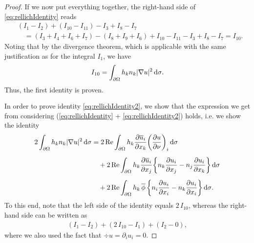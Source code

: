 \begin{proof}
  If we now put everything together, the right-hand side of \eqref{eq:rellichIdentity} reads
  \begin{align*}
    &(I_1 - I_2) + (I_{10} - I_{11}) - I_3 + I_8 - I_7 \\
    &\quad= (I_3 + I_4 + I_6 + I_7) - (I_8 + I_9 + I_6) + I_{10} - I_{11} - I_3 + I_8 - I_7 = I_{10}.
  \end{align*}
  Noting that by the divergence theorem, which is applicable with the same justification as for the integral $I_1$, we have
  \begin{align*}
    I_{10} = \int_{\partial\Omega} h_k n_k |\nabla u|^2 \, {\operatorname{d}\!{\sigma}}.
  \end{align*}
  Thus, the first identity is proven.

  In order to prove identity \eqref{eq:rellichIdentity2}, we show that the expression we get from considering (\eqref{eq:rellichIdentity} + \eqref{eq:rellichIdentity2}) holds, i.e. we show the identity
  \begin{align*}
    2 \int_{\partial\Omega} h_k n_k |\nabla u|^2 \, {\operatorname{d}\!{\sigma}}
    &= 2 \operatorname{Re} \int_{\partial\Omega} h_k \frac{\partial \overline u_i}{\partial x_k} \bigg( \frac{\partial u}{\partial \nu} \bigg)_i \, {\operatorname{d}\!{\sigma}} \\[0.5em]
    &\quad + 2 \operatorname{Re} \int_{\partial\Omega} h_k \frac{\partial\overline u_i}{\partial x_j} \bigg\{ n_k \frac{\partial u_i}{\partial x_j} - n_j \frac{\partial u_i}{\partial x_k} \bigg\} \, {\operatorname{d}\!{\sigma}} \\[0.5em]
    &\quad+ 2 \operatorname{Re} \int_{\partial\Omega} h_k \, \overline \phi\,  \bigg\{ n_i \frac{\partial u_i}{\partial x_i} - n_k \frac{\partial u_i}{\partial x_i} \bigg\} \, {\operatorname{d}\!{\sigma}}.
  \end{align*}
  To this end, note that the left side of the identity equals $2\, I_{10}$, whereas the right-hand side can be written as 
  \begin{align*}
    (I_1 - I_2) + ( 2 \, I_{10} - I_1) + (I_2 - 0),
  \end{align*}
  where we also used the fact that $\div u = \partial_i u_i = 0$.
\end{proof}

